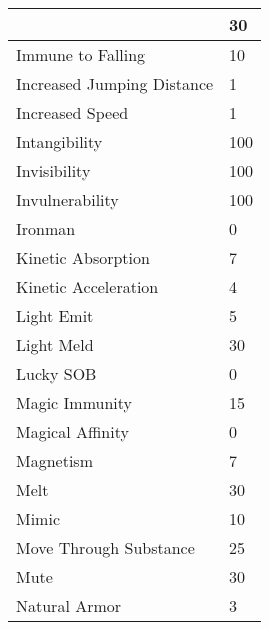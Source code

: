 \documentclass[twoside]{book}
\begin{document}
\begin{longtable}{p{1.25in}l}
  &
   30 
  \tabularnewline
  \hline
      
  \raggedright
           Immune to Falling 
  &
   10 
  \tabularnewline
  \hline
      
  \raggedright
           Increased Jumping Distance
           
  &
   1 
  \tabularnewline
  \hline
      
  \raggedright
           Increased Speed 
  &
   1 
  \tabularnewline
  \hline
      
  \raggedright
           Intangibility 
  &
   100 
  \tabularnewline
  \hline
      
  \raggedright
           Invisibility 
  &
   100 
  \tabularnewline
  \hline
      
  \raggedright
           Invulnerability 
  &
   100 
  \tabularnewline
  \hline
      
  \raggedright
           Ironman 
  &
   0 
  \tabularnewline
  \hline
      
  \raggedright
           Kinetic Absorption 
  &
   7 
  \tabularnewline
  \hline
      
  \raggedright
           Kinetic Acceleration 
  &
   4 
  \tabularnewline
  \hline
      
  \raggedright
           Light Emit 
  &
   5 
  \tabularnewline
  \hline
      
  \raggedright
           Light Meld 
  &
   30 
  \tabularnewline
  \hline
      
  \raggedright
           Lucky SOB 
  &
   0 
  \tabularnewline
  \hline
      
  \raggedright
           Magic Immunity 
  &
   15 
  \tabularnewline
  \hline
      
  \raggedright
           Magical Affinity 
  &
   0 
  \tabularnewline
  \hline
      
  \raggedright
           Magnetism 
  &
   7 
  \tabularnewline
  \hline
      
  \raggedright
           Melt 
  &
   30 
  \tabularnewline
  \hline
      
  \raggedright
           Mimic 
  &
   10 
  \tabularnewline
  \hline
      
  \raggedright
           Move Through Substance 
  &
   25 
  \tabularnewline
  \hline
      
  \raggedright
           Mute 
  &
   30 
  \tabularnewline
  \hline
      
  \raggedright
           Natural Armor 
  &
   3 
  \tabularnewline
  \hline
      

\end{longtable}
\end{document}
